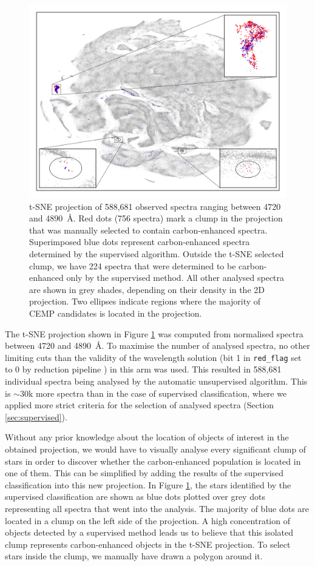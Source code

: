 \begin{figure}
	\centering
	\includegraphics[width=\textwidth]{tsne_circles.png}
	\caption{t-SNE projection of 588,681 observed spectra ranging between 4720 and 4890~\AA. Red dots (756 spectra) mark a clump in the projection that was manually selected to contain carbon-enhanced spectra. Superimposed blue dots represent carbon-enhanced spectra determined by the supervised algorithm. Outside the t-SNE selected clump, we have 224 spectra that were determined to be carbon-enhanced only by the supervised method. All other analysed spectra are shown in grey shades, depending on their density in the 2D projection. Two ellipses indicate regions where the majority of CEMP candidates is located in the projection.}
	\label{fig:tsne_plot}
\end{figure}

The t-SNE projection shown in Figure \ref{fig:tsne_plot} was computed from normalised spectra between 4720 and 4890~\AA. To maximise the number of analysed spectra, no other limiting cuts than the validity of the wavelength solution (bit 1 in \texttt{red\_flag} set to 0 by reduction pipeline \cite{2017MNRAS.464.1259K}) in this arm was used. This resulted in 588,681 individual spectra being analysed by the automatic unsupervised algorithm. This is $\sim30$k more spectra than in the case of supervised classification, where we applied more strict criteria for the selection of analysed spectra (Section \ref{sec:supervised}). 

Without any prior knowledge about the location of objects of interest in the obtained projection, we would have to visually analyse every significant clump of stars in order to discover whether the carbon-enhanced population is located in one of them. This can be simplified by adding the results of the supervised classification into this new projection. In Figure \ref{fig:tsne_plot}, the stars identified by the supervised classification are shown as blue dots plotted over grey dots representing all spectra that went into the analysis. The majority of blue dots are located in a clump on the left side of the projection. A high concentration of objects detected by a supervised method leads us to believe that this isolated clump represents carbon-enhanced objects in the t-SNE projection. To select stars inside the clump, we manually have drawn a polygon around it.


